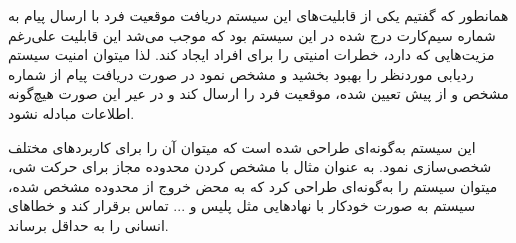همانطور که گفتیم یکی از قابلیت‌های این سیستم دریافت موقعیت فرد با ارسال پیام به شماره سیم‌کارت درج شده در این سیستم بود که موجب می‌شد این قابلیت علی‌رغم مزیت‌هایی که دارد، خطرات امنیتی را برای افراد ایجاد کند. لذا میتوان امنیت سیستم ردیابی موردنظر را بهبود بخشید و مشخص نمود در صورت دریافت پیام از شماره مشخص و از پیش تعیین شده، موقعیت فرد را ارسال کند و در عیر این صورت هیچ‌گونه اطلاعات مبادله نشود.


این سیستم به‌گونه‌ای طراحی شده است که میتوان آن را برای کاربردهای مختلف شخصی‌سازی نمود. به عنوان مثال با مشخص کردن محدوده مجاز برای حرکت شی، میتوان سیستم را به‌گونه‌ای طراحی کرد که به محض خروج از محدوده مشخص شده، سیستم به صورت خودکار با نهادهایی مثل پلیس و ... تماس برقرار کند و خطاهای انسانی را به حداقل برساند.